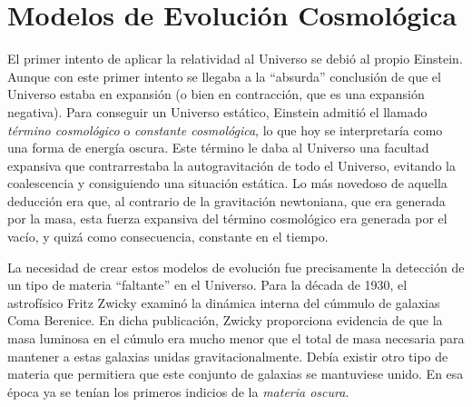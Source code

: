 \documentclass[a4paper,openright,12pt]{book}
\begin{document}
\section{Modelos de Evolución Cosmológica}
El primer intento de aplicar la relatividad al Universo se debió al propio Einstein. Aunque con este primer intento se llegaba a la ``absurda'' conclusión de que el Universo estaba en expansión (o bien en contracción, que es una expansión negativa). Para conseguir un Universo estático, Einstein admitió el llamado \textit{término cosmológico} o \textit{constante cosmológica}, lo que hoy se interpretaría como una forma de energía oscura. Este término le daba al Universo una facultad expansiva que contrarrestaba la autogravitación de todo el Universo, evitando la coalescencia y consiguiendo una situación estática. Lo más novedoso de aquella deducción era que, al contrario de la gravitación newtoniana, que era generada por la masa, esta fuerza expansiva del término cosmológico era generada por el vacío, y quizá como consecuencia, constante en el tiempo.

La necesidad de crear estos modelos de evolución fue precisamente la detección de un tipo de materia ``faltante'' en el Universo. Para la década de 1930, el astrofísico Fritz Zwicky \cite{1.1.1} examinó la dinámica interna del cúmmulo de galaxias Coma Berenice. En dicha publicación, Zwicky proporciona evidencia de que la masa luminosa en el cúmulo era mucho menor que el total de masa  necesaria para mantener a estas galaxias unidas gravitacionalmente. Debía existir otro tipo de materia que permitiera que este conjunto de galaxias se mantuviese unido. En esa época ya se tenían los primeros indicios de la \textit{materia oscura}.
\end{document}
